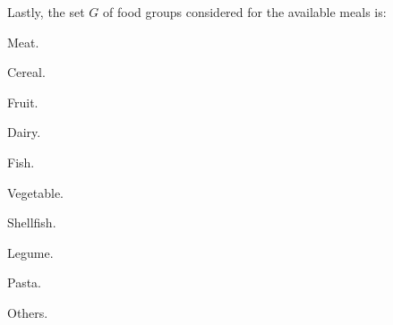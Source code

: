 Lastly, the set $G$ of food groups considered for the available meals is: 
\begin{AutoMultiColItemize}
    \item Meat.
    \item Cereal.
    \item Fruit.
    \item Dairy.
    \item Fish.
    \item Vegetable.
    \item Shellfish.
    \item Legume.
    \item Pasta.
    \item Others.
\end{AutoMultiColItemize}

